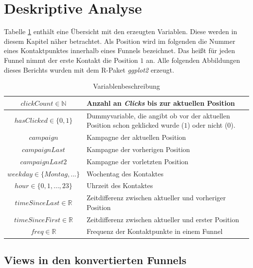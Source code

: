 \section{Deskriptive  Analyse}\label{descriptiv}

Tabelle \ref{varbeschreibung} enthält eine Übersicht mit den erzeugten Variablen. Diese werden in diesem Kapitel näher betrachtet. Als Position wird im folgenden die Nummer eines Kontaktpunktes innerhalb eines Funnels bezeichnet. Das heißt für jeden Funnel nimmt der erste Kontakt die Position $1$ an. Alle folgenden Abbildungen dieses Berichts wurden mit dem R-Paket \textit{ggplot2} \cite{ggplot2} erzeugt.
\begin{table}[H]
    \begin{center}
\begin{tabular}{|c|p{10cm}|}
		\hline $ clickCount \in \mathbb{N} $ & Anzahl an \textit{Clicks} bis zur aktuellen Position\\
    \hline $ hasClicked\in\{0,1\} $  & Dummyvariable, die angibt ob vor der aktuellen Position schon geklicked wurde ($1$) oder nicht ($0$). \\
		\hline $ campaign $ & Kampagne der aktuellen Position\\ 
    \hline $ campaignLast $ & Kampagne der vorherigen Position\\ 
    \hline $ campaignLast2 $  & Kampagne der vorletzten Position\\
    \hline $ weekday \in \{Montag,...\}$ & Wochentag des Kontaktes  \\
    \hline $ hour \in \{0,1,\dots, 23\} $  & Uhrzeit des Kontaktes \\
    \hline $ timeSinceLast \in \mathbb{R}$  & Zeitdifferenz zwischen aktueller und vorheriger Position\\
    \hline $ timeSinceFirst \in \mathbb{R} $ & Zeitdifferenz zwischen aktueller und erster Position\\
    \hline$ freq \in \mathbb{R} $ & Frequenz der Kontaktpunkte in einem Funnel\\
    \hline
\end{tabular} 
 \end{center}
 \caption{Variablenbeschreibung}\label{varbeschreibung}
\end{table}

\subsection{Views in den konvertierten Funnels}\label{plotsViews}

